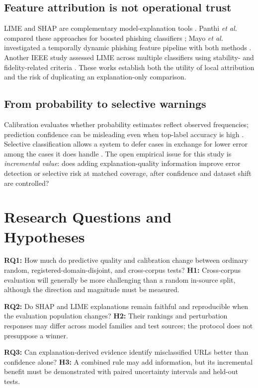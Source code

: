 \documentclass[conference,letterpaper]{IEEEtran}
\begin{document}
\subsection{Feature attribution is not operational trust}
LIME and SHAP are complementary model-explanation tools \cite{ribeiro2016,lundberg2017}. Panthi \emph{et al.} compared these approaches for boosted phishing classifiers \cite{panthi2026}; Mayo \emph{et al.} investigated a temporally dynamic phishing feature pipeline with both methods \cite{mayo2026}. Another IEEE study assessed LIME across multiple classifiers using stability- and fidelity-related criteria \cite{limephish2025}. These works establish both the utility of local attribution and the risk of duplicating an explanation-only comparison.

\subsection{From probability to selective warnings}
Calibration evaluates whether probability estimates reflect observed frequencies; prediction confidence can be misleading even when top-label accuracy is high \cite{guo2017}. Selective classification allows a system to defer cases in exchange for lower error among the cases it does handle \cite{geifman2017}. The open empirical issue for this study is \emph{incremental value}: does adding explanation-quality information improve error detection or selective risk at matched coverage, after confidence and dataset shift are controlled?

\section{Research Questions and Hypotheses}
\textbf{RQ1:} How much do predictive quality and calibration change between ordinary random, registered-domain-disjoint, and cross-corpus tests? \textbf{H1:} Cross-corpus evaluation will generally be more challenging than a random in-source split, although the direction and magnitude must be measured.

\textbf{RQ2:} Do SHAP and LIME explanations remain faithful and reproducible when the evaluation population changes? \textbf{H2:} Their rankings and perturbation responses may differ across model families and test sources; the protocol does not presuppose a winner.

\textbf{RQ3:} Can explanation-derived evidence identify misclassified URLs better than confidence alone? \textbf{H3:} A combined rule may add information, but its incremental benefit must be demonstrated with paired uncertainty intervals and held-out tests.
\end{document}

